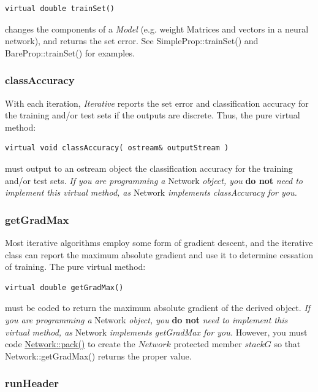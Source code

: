 \documentclass{report}
\begin{document}
\begin{verbatim}
virtual double trainSet()
\end{verbatim}

changes the components of a {\em Model} (e.g. weight Matrices and
vectors in a neural network), and returns the set error.  See
SimpleProp::trainSet() and BareProp::trainSet() for examples.

\subsubsection{classAccuracy}

With each iteration, {\em Iterative} reports the set error and
classification accuracy for the training and/or test sets if the
outputs are discrete.  Thus, the pure virtual method:

\begin{verbatim}
virtual void classAccuracy( ostream& outputStream )
\end{verbatim}

must output to an ostream object the classification accuracy for the
training and/or test sets.  {\em If you are programming a} Network
{\em object, you} {\bf do not} {\em need to implement this virtual
method, as} Network {\em implements classAccuracy for you.}

\subsubsection{getGradMax}

Most iterative algorithms employ some form of gradient descent, and
the iterative class can report the maximum absolute gradient and use
it to determine cessation of training.  The pure virtual method:

\begin{verbatim}
virtual double getGradMax()
\end{verbatim}

must be coded to return the maximum absolute gradient of the derived
object. {\em If you are programming a} Network {\em object, you}
{\bf do not} {\em need to implement this virtual method, as} Network
{\em implements getGradMax for you.}  However, you must code
\hyperref[packutil]{Network::pack()} to create the $Network$ protected
member $stackG$ so that Network::getGradMax() returns the proper
value.

\subsubsection{runHeader}\label{runHeaderSection}
\end{document}
